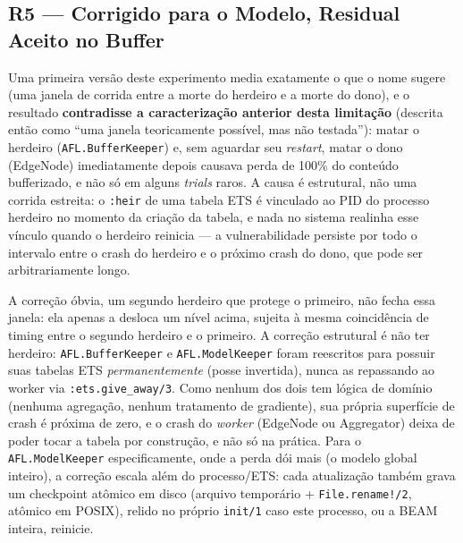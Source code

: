 \documentclass[conference,a4paper]{IEEEtran}
\begin{document}
\subsection{R5 --- Corrigido para o Modelo, Residual Aceito no Buffer}
\label{sec:r5}

Uma primeira versão deste experimento media exatamente o que o nome
sugere (uma janela de corrida entre a morte do herdeiro e a morte do
dono), e o resultado \textbf{contradisse a caracterização anterior
desta limitação} (descrita então como ``uma janela teoricamente
possível, mas não testada''): matar o herdeiro (\texttt{AFL.BufferKeeper})
e, sem aguardar seu \textit{restart}, matar o dono (EdgeNode) imediatamente
depois causava perda de 100\% do conteúdo bufferizado, e não só em
alguns \textit{trials} raros. A causa é estrutural, não uma corrida
estreita: o \texttt{:heir} de uma tabela ETS é vinculado ao PID do
processo herdeiro no momento da criação da tabela, e nada no sistema
realinha esse vínculo quando o herdeiro reinicia --- a vulnerabilidade
persiste por todo o intervalo entre o crash do herdeiro e o próximo crash
do dono, que pode ser arbitrariamente longo.

A correção óbvia, um segundo herdeiro que protege o primeiro, não
fecha essa janela: ela apenas a desloca um nível acima, sujeita à mesma
coincidência de timing entre o segundo herdeiro e o primeiro. A correção
estrutural é não ter herdeiro: \texttt{AFL.BufferKeeper} e
\texttt{AFL.ModelKeeper} foram reescritos para possuir suas tabelas ETS
\emph{permanentemente} (posse invertida), nunca as repassando ao worker
via \texttt{:ets.give\_away/3}. Como nenhum dos dois tem lógica de
domínio (nenhuma agregação, nenhum tratamento de gradiente), sua própria
superfície de crash é próxima de zero, e o crash do \emph{worker}
(EdgeNode ou Aggregator) deixa de poder tocar a tabela por construção,
e não só na prática. Para o \texttt{AFL.ModelKeeper} especificamente,
onde a perda dói mais (o modelo global inteiro), a correção escala além
do processo/ETS: cada atualização também grava um checkpoint atômico em
disco (arquivo temporário + \texttt{File.rename!/2}, atômico em POSIX),
relido no próprio \texttt{init/1} caso este processo, ou a BEAM
inteira, reinicie.
\end{document}
